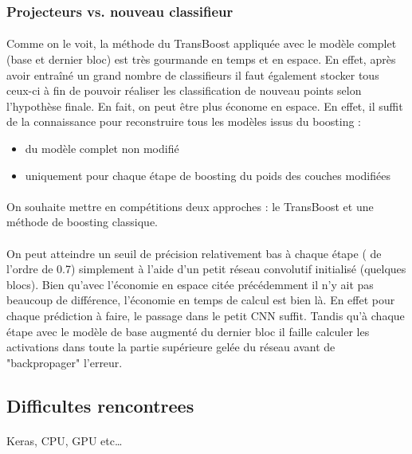 \documentclass[11 pt]{article}
\begin{document}
\subsubsection{Projecteurs vs. nouveau classifieur}
\paragraph{}Comme on le voit, la méthode du TransBoost appliquée avec le modèle complet (base et dernier bloc) est très gourmande en temps et en espace. En effet, après avoir entraîné un grand nombre de classifieurs il faut également stocker tous ceux-ci à fin de pouvoir réaliser les classification de nouveau points selon l’hypothèse finale. En fait, on peut être plus économe en espace. En effet, il suffit de la connaissance pour reconstruire tous les modèles issus du boosting :\\ \medskip
\begin{itemize}
  \item du modèle complet non modifié
  \item uniquement pour chaque étape de boosting du poids des couches modifiées
\end{itemize}
\paragraph{}On souhaite mettre en compétitions deux approches : le TransBoost et une méthode de boosting classique.

\paragraph{}On peut atteindre un seuil de précision relativement bas à chaque étape ( de l’ordre de 0.7) simplement à l’aide d’un petit réseau convolutif initialisé (quelques blocs). Bien qu’avec l’économie en espace citée précédemment il n’y ait pas beaucoup de différence, l’économie en temps de calcul est bien là. En effet pour chaque prédiction à faire, le passage dans le petit CNN suffit. Tandis qu’à chaque étape avec le modèle de base augmenté du dernier bloc il faille calculer les activations dans toute la partie supérieure gelée du réseau avant de "backpropager" l’erreur.


\subsection{Difficultes rencontrees}
\paragraph{}Keras, CPU, GPU etc\ldots
\end{document}
